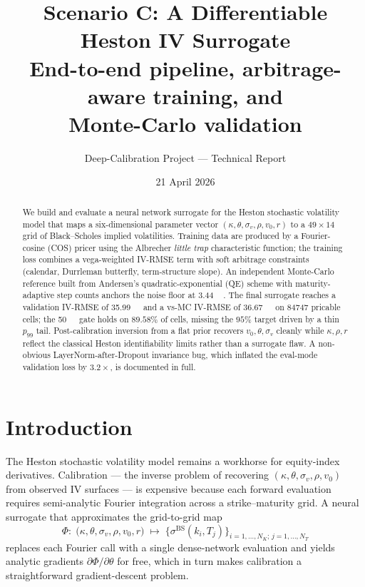 \documentclass[11pt,a4paper]{article}
\title{
  \textbf{Scenario C: A Differentiable Heston IV Surrogate}\\
  \large End-to-end pipeline, arbitrage-aware training, and\\
  Monte-Carlo validation
}
\author{Deep-Calibration Project --- Technical Report}
\date{21 April 2026}
\newcommand{\bps}{\,\text{bps}}
\begin{document}
\maketitle

\begin{abstract}
We build and evaluate a neural network surrogate for the Heston stochastic
volatility model that maps a six-dimensional parameter vector
$(\kappa,\theta,\sigma_v,\rho,v_0,r)$ to a $49\times14$ grid of
Black--Scholes implied volatilities. Training data are produced by a
Fourier-cosine (COS) pricer using the Albrecher \emph{little trap}
characteristic function; the training loss combines a vega-weighted
IV-RMSE term with soft arbitrage constraints (calendar, Durrleman
butterfly, term-structure slope). An independent Monte-Carlo reference
built from Andersen's quadratic-exponential (QE) scheme with
maturity-adaptive step counts anchors the noise floor at
\SI{3.44}{\bps}. The final surrogate reaches a validation IV-RMSE of
\SI{35.99}{\bps} and a vs-MC IV-RMSE of \SI{36.67}{\bps} on
\num{84747} pricable cells; the \SI{50}{\bps} gate holds on $89.58\%$
of cells, missing the $95\%$ target driven by a thin $p_{99}$ tail.
Post-calibration inversion from a flat prior recovers
$v_0,\theta,\sigma_v$ cleanly while $\kappa,\rho,r$ reflect the
classical Heston identifiability limits rather than a surrogate flaw.
A non-obvious LayerNorm-after-Dropout invariance bug, which inflated
the eval-mode validation loss by $3.2\times$, is documented in full.
\end{abstract}

\tableofcontents

\section{Introduction}
\label{sec:intro}

The Heston \cite{heston1993} stochastic volatility model remains a
workhorse for equity-index derivatives. Calibration --- the inverse
problem of recovering $(\kappa,\theta,\sigma_v,\rho,v_0)$ from observed
IV surfaces --- is expensive because each forward evaluation requires
semi-analytic Fourier integration across a strike--maturity grid.
A neural surrogate that approximates the grid-to-grid map
\[
  \Phi:\;
  \bigl(\kappa,\theta,\sigma_v,\rho,v_0,r\bigr)\;\longmapsto\;
  \bigl\{\sigma^{\text{BS}}(k_i,T_j)\bigr\}_{i=1,\dots,N_K;\,j=1,\dots,N_T}
\]
replaces each Fourier call with a single dense-network evaluation and
yields analytic gradients $\partial\Phi/\partial\theta$ for free,
which in turn makes calibration a straightforward gradient-descent
problem.
\end{document}
